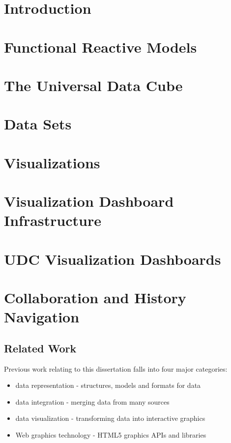 \documentclass[12pt]{report}
\begin{document}
\begin{doublespace}

\chapter{Introduction}

\pagebreak
\chapter{Functional Reactive Models}

\pagebreak
\chapter{The Universal Data Cube}
\chapter{Data Sets}
\chapter{Visualizations}
\chapter{Visualization Dashboard Infrastructure}
\chapter{UDC Visualization Dashboards}
\chapter{Collaboration and History Navigation}

\section{Related Work}
Previous work relating to this dissertation falls into four major categories:
\begin{itemize}
\item data representation - structures, models and formats for data
\item data integration - merging data from many sources
\item data visualization - transforming data into interactive graphics
\item Web graphics technology - HTML5 graphics APIs and libraries
\end{itemize}

\end{doublespace}
\end{document}
